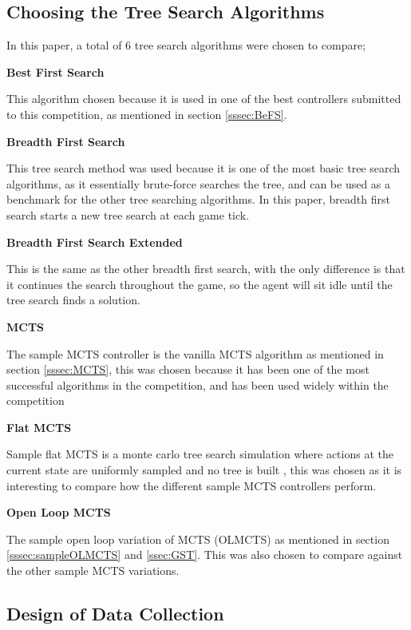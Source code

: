 \documentclass[journal]{IEEEtran}
\begin{document}
	\subsection{Choosing the Tree Search Algorithms}
	In this paper, a total of 6 tree search algorithms were chosen to compare;
	
	\textbf{Best First Search}

	This algorithm chosen because it is used in one of the best controllers submitted to this competition, as mentioned in section \ref{sssec:BeFS}.

	\textbf{Breadth First Search}

This tree search method was used because it is one of the most basic tree search algorithms, as it essentially brute-force searches the tree, and can be used as a benchmark for the other tree searching algorithms. In this paper, breadth first search starts a new tree search at each game tick.

	\textbf{Breadth First Search Extended}

	This is the same as the other breadth first search, with the only difference is that it continues the search throughout the game, so the agent will sit idle until the tree search finds a solution.

	\textbf{MCTS}

	The sample MCTS controller is the vanilla MCTS algorithm as mentioned in section \ref{sssec:MCTS}, this was chosen because it has been one of the most successful algorithms in the competition, and has been used widely within the competition \cite{perez20162014, perez2018general}

	\textbf{Flat MCTS}

	Sample flat MCTS is a monte carlo tree search simulation where actions at the current state are uniformly sampled and no tree is built \cite{browne2012survey}, this was chosen as it is interesting to compare how the different sample MCTS controllers perform.

	\textbf{Open Loop MCTS}

	The sample open loop variation of MCTS (OLMCTS) as mentioned in section \ref{sssec:sampleOLMCTS} and \ref{ssec:GST}. This was also chosen to compare against the other sample MCTS variations.

	
	

	\subsection{Design of Data Collection}
	
\end{document}
